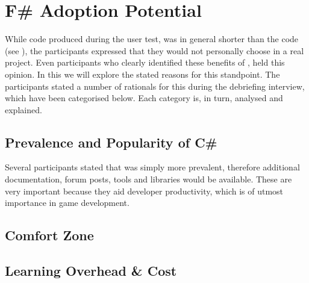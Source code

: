 \section{F\# Adoption Potential}
While \fs code produced during the user test, was in general shorter than the \cs code (see ), the participants expressed that they would not personally choose \fs in a real project. Even participants who clearly identified these benefits of \fs, held this opinion. In this we will explore the stated reasons for this standpoint. The participants stated a number of rationals for this during the debriefing interview, which have been categorised below. Each category is, in turn, analysed and explained.

\subsection{Prevalence and Popularity of C\#}
Several participants stated that \cs was simply more prevalent, therefore additional documentation, forum posts, tools and libraries would be available. These are very important because they aid developer productivity, which is of utmost importance in game development.

\subsection{Comfort Zone}


\subsection{Learning Overhead \& Cost}
